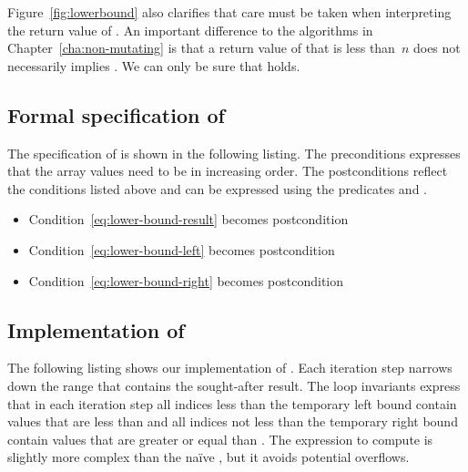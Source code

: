 
Figure~\ref{fig:lowerbound} also clarifies that care must
be taken when interpreting the return value of \lowerbound.
%
An important difference to the algorithms in Chapter~\ref{cha:non-mutating}
is that a return value of \lowerbound that is less than~$n$ 
does not necessarily implies .
We can only be sure that  holds.


\subsection{Formal specification of \lowerbound}

The specification of  is shown in the following listing.
The preconditions  expresses
that the array values need to be in increasing order.
%
The postconditions reflect the conditions listed above and can be expressed
using the predicates  and .

\begin{itemize}
\item Condition~\eqref{eq:lower-bound-result} becomes postcondition 
\item Condition~\eqref{eq:lower-bound-left} becomes postcondition 
\item Condition~\eqref{eq:lower-bound-right} becomes postcondition 
\end{itemize}



\subsection{Implementation of \lowerbound}

The following listing shows our implementation of .
Each iteration step narrows down the range that contains the
sought-after result. 
The loop invariants express that in each iteration step all indices
less than the temporary left bound
 contain values that are less than  and all indices
not less than the temporary right bound  contain values
that are greater or equal than .
%
The expression to compute  is slightly more complex than the
naïve , but it avoids potential overflows.



